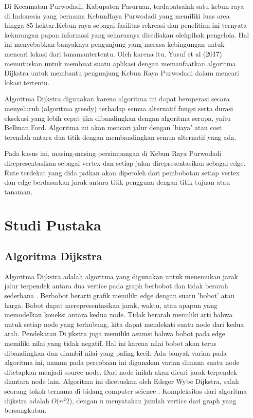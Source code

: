 \documentclass[conference]{IEEEtran}
\begin{document}
Di Kecamatan Purwodadi, Kabupaten Pasuruan, terdapatsalah satu kebun raya di Indonesia yang bernama KebunRaya Purwodadi yang memiliki luas area hingga 85 hektar.Kebun raya sebagai fasilitas rekreasi dan penelitian ini ternyata kekurangan papan informasi yang seharusnya disediakan olehpihak pengelola. Hal ini menyebabkan banyaknya pengunjung yang merasa kebingungan untuk mencari lokasi dari tanamantertentu. Oleh karena itu, Yusuf et al (2017) memutuskan untuk membuat suatu aplikasi dengan memanfaatkan algoritma Dijkstra untuk membantu pengunjung Kebun Raya Purwodadi dalam mencari lokasi tertentu.

Algoritma Dijkstra digunakan karena algoritma ini dapat beroperasi secara menyeluruh (algoritma greedy) terhadap semua alternatif fungsi serta durasi eksekusi yang lebih cepat jika dibandingkan dengan algoritma serupa, yaitu BellmanFord. Algoritma ini akan mencari jalur dengan ’biaya’ atau cost terendah antara dua titik dengan membandingkan semua alternatif yang ada.

Pada kasus ini, masing-masing persimpangan di Kebun Raya Purwodadi direpresentasikan sebagai vertex dan setiap jalan direpresentasikan sebagai edge. Rute terdekat yang didapatkan akan diperoleh dari pembobotan setiap vertex dan edge berdasarkan jarak antara titik pengguna dengan titik tujuan atau tanaman.

\section{Studi Pustaka}

\subsection{Algoritma Dijkstra}

Algoritma Dijkstra adalah algoritma yang digunakan untuk menemukan jarak jalur terpendek antara dua vertice pada graph berbobot dan tidak berarah sederhana \cite{b2}. Berbobot berarti grafik memiliki edge dengan suatu ’bobot’ atau harga. Bobot dapat merepresentasikan jarak, waktu, atau apapun yang memodelkan koneksi antara kedua node. Tidak berarah memiliki arti bahwa untuk setiap node yang terhubung, kita dapat mendekati suatu node dari kedua arah. Pendekatan Dijikstra juga memiliki asumsi bahwa bobot pada edge memiliki nilai yang tidak negatif. Hal ini karena nilai bobot akan terus dibandingkan dan diambil nilai yang paling kecil. Ada banyak varian pada algoritma ini, namun pada percobaan ini digunakan varian dimana suatu node ditetapkan menjadi source node. Dari node inilah akan dicari jarak terpendek diantara node lain. Algoritma ini dicetuskan oleh Edsger Wybe Dijkstra, salah seorang tokoh ternama di bidang computer science \cite{b3}. Kompleksitas dari algoritma dijkstra adalah $ O(n^{2} $2), dengan n menyatakan jumlah vertice dari graph yang bersangkutan.
\end{document}
